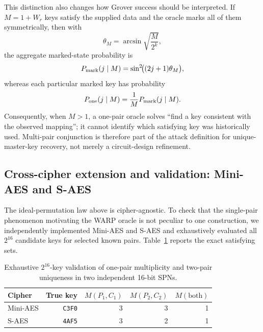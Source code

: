 \documentclass[10pt,a4paper]{article}
\begin{document}
This distinction also changes how Grover success should be interpreted.  If $M=1+W_r$ keys satisfy the supplied data and the oracle marks all of them symmetrically, then with
\begin{equation}
    \theta_M=\arcsin\sqrt{\frac{M}{2^k}},
\end{equation}
the aggregate marked-state probability is
\begin{equation}
    P_{\rm mark}(j\mid M)=
    \sin^2\!\bigl((2j+1)\theta_M\bigr),
    \label{eq:aggregate_marked_probability}
\end{equation}
whereas each particular marked key has probability
\begin{equation}
    P_{\rm one}(j\mid M)=\frac{1}{M}P_{\rm mark}(j\mid M).
    \label{eq:specific_marked_probability}
\end{equation}
Consequently, when $M>1$, a one-pair oracle solves ``find a key consistent with the observed mapping''; it cannot identify which satisfying key was historically used.  Multi-pair conjunction is therefore part of the attack definition for unique-master-key recovery, not merely a circuit-design refinement.

\subsection{Cross-cipher extension and validation: Mini-AES and S-AES}
\label{subsec:cross_cipher_validation}
The ideal-permutation law above is cipher-agnostic.  To check that the single-pair phenomenon motivating the WARP oracle is not peculiar to one construction, we independently implemented Mini-AES and S-AES and exhaustively evaluated all $2^{16}$ candidate keys for selected known pairs.  Table~\ref{tab:cross_cipher_validation} reports the exact satisfying sets.

\begin{table}[H]
\centering
\caption{Exhaustive $2^{16}$-key validation of one-pair multiplicity and two-pair uniqueness in two independent 16-bit SPNs.}
\label{tab:cross_cipher_validation}
\begin{tabular}{lrrrr}
\toprule
Cipher & True key & $M(P_1,C_1)$ & $M(P_2,C_2)$ & $M(\text{both})$\\
\midrule
Mini-AES & \texttt{C3F0} & 3 & 3 & 1\\
S-AES & \texttt{4AF5} & 3 & 2 & 1\\
\bottomrule
\end{tabular}
\end{table}
\end{document}
